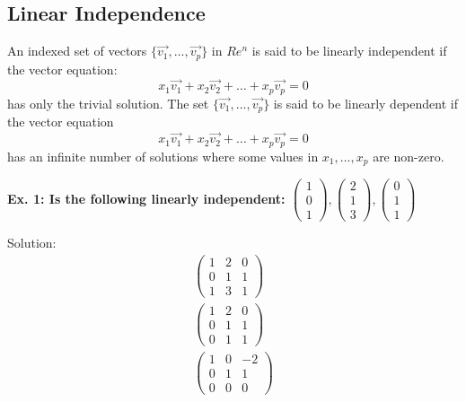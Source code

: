 \subsection{Linear Independence}
\begin{definition}
    An indexed set of vectors \(\{\Vec{v_1}, \dots, \Vec{v_p}\}\) in \(Re^n\) is said to be linearly independent if the vector equation:
    \[x_1\Vec{v_1} + x_2\Vec{v_2} + \dots + x_p \Vec{v_p} = 0\]
    has only the trivial solution. The set \(\{\Vec{v_1}, \dots, \Vec{v_p}\}\) is said to be linearly dependent if the vector equation \[x_1\Vec{v_1} + x_2\Vec{v_2} + \dots + x_p \Vec{v_p} = 0\] has an infinite number of solutions where some values in \(x_1, \dots, x_p\) are non-zero.
\end{definition}

\noindent
\newline
\textbf{Ex. 1: Is the following linearly independent: \(\begin{pmatrix}1 \\ 0 \\ 1\end{pmatrix}, \begin{pmatrix}2 \\ 1 \\ 3\end{pmatrix}, \begin{pmatrix}0 \\ 1 \\ 1\end{pmatrix}\)}

\noindent
\newline
Solution:
\begin{align}
    \begin{pmatrix}
        1 & 2 & 0 \\
        0 & 1 & 1 \\
        1 & 3 & 1
    \end{pmatrix} \\
    \begin{pmatrix}
        1 & 2 & 0 \\
        0 & 1 & 1 \\
        0 & 1 & 1
    \end{pmatrix} \\
    \begin{pmatrix}
        1 & 0 & -2 \\
        0 & 1 & 1 \\
        0 & 0 & 0
    \end{pmatrix} \\
\end{align}

